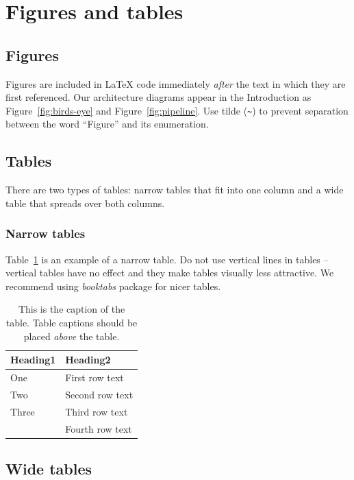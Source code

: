 \documentclass[10pt, a4paper]{article}
\begin{document}
\section{Figures and tables}

\subsection{Figures}

Figures are included in \LaTeX{} code immediately \textit{after} the text in which they are first referenced.
Our architecture diagrams appear in the Introduction as Figure~\ref{fig:birds-eye} and Figure~\ref{fig:pipeline}.
Use tilde (\verb.~.) to prevent separation between the word ``Figure'' and its enumeration.

\subsection{Tables}

There are two types of tables: narrow tables that fit into one column and a wide table that spreads over both columns.

\subsubsection{Narrow tables}

Table~\ref{tab:narrow-table} is an example of a narrow table. Do not use vertical lines in tables -- vertical tables have no effect and they make tables visually less attractive. We recommend using \textit{booktabs} package for nicer tables.

\begin{table}
\caption{This is the caption of the table. Table captions should be placed \textit{above} the table.}
\label{tab:narrow-table}
\begin{center}
\begin{tabular}{ll}
\toprule
Heading1 & Heading2 \\
\midrule
One & First row text \\
Two   & Second row text \\
Three   & Third row text \\
      & Fourth row text \\
\bottomrule
\end{tabular}
\end{center}
\end{table}

\subsection{Wide tables}
\end{document}
